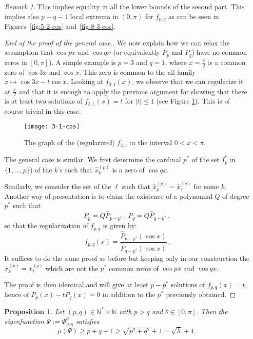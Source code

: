 \documentclass[a4paper,reqno,11pt]{amsart}
\newtheorem{prop}[thm]{Proposition}
\theoremstyle{remark}
\newtheorem{remark}[thm]{Remark}
\theoremstyle{definition}
\numberwithin{equation}{section}
\begin{document}
\begin{remark}
This implies equality in all the lower 
bounds of the second part. This implies also  $ p-q-1$ local extrema  in 
$(0,\pi)$ for $f_{p,q}$ as can be seen in Figures~\ref{fig:5-2-cos} 
and~\ref{fig:8-3-cos}.
\end{remark}
 
\begin{proof}[End of the proof of the general case.]
We now explain how we can relax the assumption that $\cos px$ and $\cos qx$ 
(or equivalently $P_p $ and $P_q $) have no common zeros in $[0,\pi]$). 
A simple example is $p=3$ and $q=1$, where $x=\frac \pi 2$ is a common zero 
of $\cos 3x$ and $\cos x$. This zero is common to the all family 
$x \mapsto \cos 3x - t \cos x$. Looking at $f_{3,1} (x)$, we observe that we 
can regularize it at $\frac \pi 2$ and that it is enough to 
 apply the previous argument for showing that there is at least two 
solutions of $f_{3,1}(x)=t$ for $|t|\leq 1$
(see Figure \ref{fig:cos-3-1}). This is of course trivial in this case.

\begin{figure}[ht]
\centering
\texttt{[image: 3-1-cos]}
\caption{The graph of the (regularized) $f_{3,1}$ in the interval 
$0<x<\pi$.}
\label{fig:cos-3-1}
\end{figure}

The general case is similar. We first determine the cardinal $p^*$  of the 
set $I^*_p$ in $\{ 1,\dots, p\}$) of the $k$'s such that $\hat x_k^{(p)}$ 
is a zero of $\cos q x$.

Similarly, we consider the set of the $\ell$ such that  
$\hat x_k^{(p)}=\hat x_\ell^{(q)}$ for some $k$. Another way of 
presentation is to claim the existence of a polynomial $Q$ of degree 
$p^*$ such that
\[
P_p = Q  \hat P_{p-p^*}\,,\, P_q = Q \hat P_{q-p^*}\,,
\]
so that the regularization of $f_{p,q}$ is given by:
\[
f_{p,q} (x) =  \frac{\hat P_{p-p^*}(\cos x)}{\hat P_{q-p^*}(\cos x)}\,.
\]
It suffices to do the same proof as before but keeping only in 
our construction the $x_k^{(p)}=x_\ell^{(q)}$ which are not the $p^*$ common 
zeros of $\cos px$ and $\cos qx$.

The proof is then identical and will give at least $p-p^*$ solutions 
of $f_{p,q}(x) =t$, hence of $P_{p}(x) - t P_q(x)=0$ in addition to the  $p^*$ previously obtained. 
\end{proof}

\begin{prop}
Let $(p,q)\in \mathbb N^*\times \mathbb N$ with $p>q$ and $\theta \in [0,\pi]$. 
Then the eigenfunction $\Psi:=\Phi^\theta_{p,q}$ satisfies
\begin{equation}\label{mupsi}
 \mu (\Psi) \geq p+q +1 \geq \sqrt{p^2 + q^2} +1 = \sqrt{\lambda} + 1\,.
 \end{equation}
\end{prop}
\end{document}
